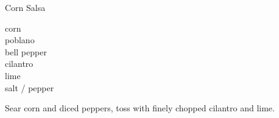 
\begin{recipe}{Corn Salsa}%
  \yield{}
  \servings{}
  \source{}
  \maketitle

  \begin{ingredients2}
    corn\\
    poblano\\
    bell pepper\\
    cilantro\\
    lime\\
    salt / pepper
  \end{ingredients2}

  Sear corn and diced peppers, toss with finely chopped cilantro and lime.
\end{recipe}

